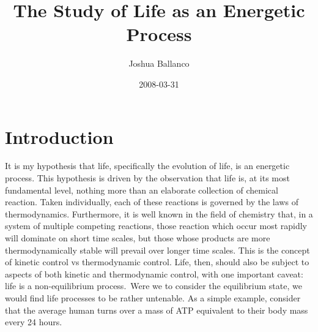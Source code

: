 \documentclass[]{book}
\title{The Study of Life as an Energetic Process}
\author{Joshua Ballanco}
\date{2008-03-31}
\begin{document}
\ifpdf
{}
\else
{}
\fi

\maketitle

\chapter{Introduction} %
\label{cha:introduction}
It is my hypothesis that life, specifically the evolution of life, is an energetic process. This hypothesis is driven by the observation that life is, at its most fundamental level, nothing more than an elaborate collection of chemical reaction. Taken individually, each of these reactions is governed by the laws of thermodynamics. Furthermore, it is well known in the field of chemistry that, in a system of multiple competing reactions, those reaction which occur most rapidly will dominate on short time scales, but those whose products are more thermodynamically stable will prevail over longer time scales. This is the concept of kinetic control vs thermodynamic control. Life, then, should also be subject to aspects of both kinetic and thermodynamic control, with one important caveat: life is a non-equilibrium process.\
Were we to consider the equilibrium state, we would find life processes to be rather untenable. As a simple example, consider that the average human turns over a mass of ATP equivalent to their body mass every 24 hours.



\end{document}
